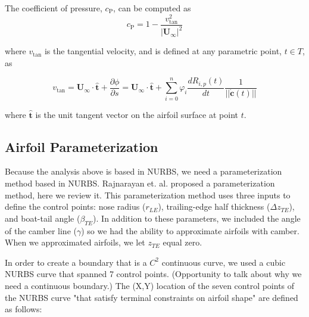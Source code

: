 	The coefficient of pressure, \(c_{\mathrm{P}}\), can be computed as
	\begin{equation}
	c_{\mathrm{P}} = 1 - \frac{v_{\mathrm{tan}}^2}{|\mathbf{U}_{\infty}|^2}
	\end{equation}
	
	\noindent where \(v_{\mathrm{tan}}\) is the tangential velocity, and is defined at any parametric point, \(t \in T\), as
	
	\begin{equation}
	v_{\mathrm{tan}} = \mathbf{U}_{\infty} \cdot \hat{\mathbf{t}} + \frac{\partial \phi}{\partial s} = \mathbf{U}_{\infty} \cdot \hat{\mathbf{t}} + \sum_{i=0}^{n} \varphi_i \frac{d R_{i,p}(t)}{dt} \frac{1}{||\dot{\mathbf{c}}(t)||}
	\end{equation}
	
	\noindent where $\hat{\mathbf{t}}$ is the unit tangent vector on the airfoil surface at point $t$.
	
	\subsection{Airfoil Parameterization}
	\label{ssec:airfoilparam}
	
	Because the analysis above is based in NURBS, we need a parameterization method based in NURBS. Rajnarayan et. al. proposed a parameterization method, here we review it. This parameterization method uses three inputs to define the control points: nose radius ($r_{LE}$), trailing-edge half thickness ($\Delta z_{TE}$), and boat-tail angle ($\beta_{TE}$). In addition to these parameters, we included the angle of the camber line ($\gamma$) so we had the ability to approximate airfoils with camber. When we approximated airfoils, we let $z_{TE}$ equal zero.
	
	In order to create a boundary that is a $C^2$ continuous curve, we used a cubic NURBS curve that spanned 7 control points. (Opportunity to talk about why we need a continuous boundary.) The (X,Y) location of the seven control points of the NURBS curve "that satisfy terminal constraints on airfoil shape" are defined as follows: 
	
